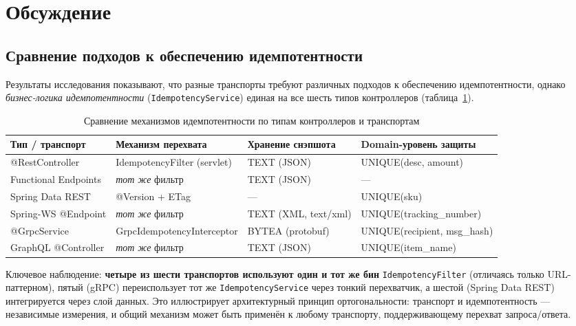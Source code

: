 \section{Обсуждение}

\subsection{Сравнение подходов к обеспечению идемпотентности}

Результаты исследования показывают, что разные транспорты требуют различных подходов к обеспечению идемпотентности, однако \emph{бизнес-логика идемпотентности} (\texttt{IdempotencyService}) единая на все шесть типов контроллеров (таблица~\ref{tab:comparison}).

\begin{table}[H]
\centering
\caption{Сравнение механизмов идемпотентности по типам контроллеров и транспортам}
\label{tab:comparison}
\scriptsize
\begin{tabularx}{\textwidth}{@{}l X X X@{}}
\toprule
\textbf{Тип / транспорт} & \textbf{Механизм перехвата} & \textbf{Хранение снэпшота} & \textbf{Domain-уровень защиты} \\
\midrule
@RestController        & IdempotencyFilter (servlet) & TEXT (JSON)               & UNIQUE(desc, amount) \\
Functional Endpoints   & \emph{тот же} фильтр        & TEXT (JSON)               & --- \\
Spring Data REST       & @Version + ETag             & ---                        & UNIQUE(sku) \\
Spring-WS @Endpoint    & \emph{тот же} фильтр        & TEXT (XML, text/xml)      & UNIQUE(tracking\_number) \\
@GrpcService           & GrpcIdempotencyInterceptor  & BYTEA (protobuf)           & UNIQUE(recipient, msg\_hash) \\
GraphQL @Controller    & \emph{тот же} фильтр        & TEXT (JSON)               & UNIQUE(item\_name) \\
\bottomrule
\end{tabularx}
\end{table}

Ключевое наблюдение: \textbf{четыре из шести транспортов используют один и тот же бин} \texttt{IdempotencyFilter} (отличаясь только URL-паттерном), пятый (gRPC) переиспользует тот же \texttt{IdempotencyService} через тонкий перехватчик, а шестой (Spring Data REST) интегрируется через слой данных. Это иллюстрирует архитектурный принцип ортогональности: транспорт и идемпотентность --- независимые измерения, и общий механизм может быть применён к любому транспорту, поддерживающему перехват запроса/ответа.

